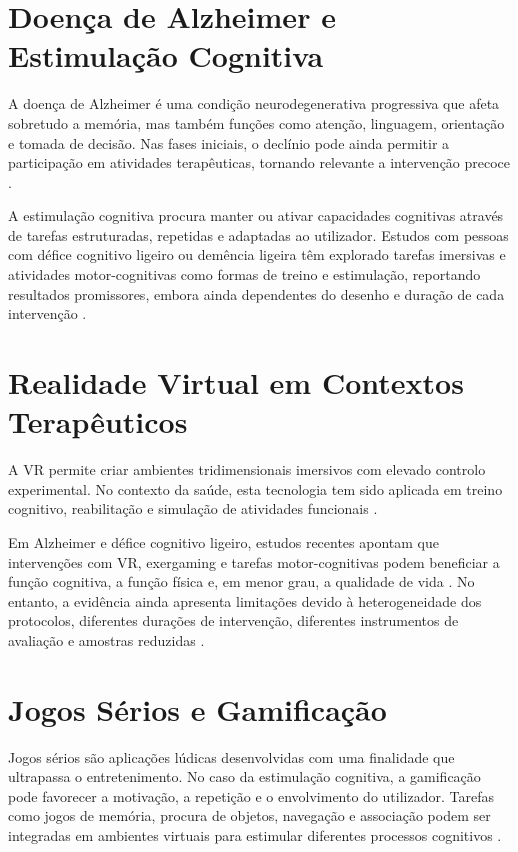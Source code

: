 \documentclass[12pt,a4paper,oneside]{report}
\begin{document}
\section{Doença de Alzheimer e Estimulação Cognitiva}

A doença de Alzheimer é uma condição neurodegenerativa progressiva que afeta sobretudo a memória, mas também funções como atenção, linguagem, orientação e tomada de decisão. Nas fases iniciais, o declínio pode ainda permitir a participação em atividades terapêuticas, tornando relevante a intervenção precoce \cite{oliveira2021,goncalves2025}.

A estimulação cognitiva procura manter ou ativar capacidades cognitivas através de tarefas estruturadas, repetidas e adaptadas ao utilizador. Estudos com pessoas com défice cognitivo ligeiro ou demência ligeira têm explorado tarefas imersivas e atividades motor-cognitivas como formas de treino e estimulação, reportando resultados promissores, embora ainda dependentes do desenho e duração de cada intervenção \cite{oliveira2021,thapa2020,yun2020}.

\section{Realidade Virtual em Contextos Terapêuticos}

A \ac{VR} permite criar ambientes tridimensionais imersivos com elevado controlo experimental. No contexto da saúde, esta tecnologia tem sido aplicada em treino cognitivo, reabilitação e simulação de atividades funcionais \cite{vasquez2025,goncalves2025}.

Em Alzheimer e défice cognitivo ligeiro, estudos recentes apontam que intervenções com \ac{VR}, exergaming e tarefas motor-cognitivas podem beneficiar a função cognitiva, a função física e, em menor grau, a qualidade de vida \cite{vasquez2025,thapa2020}. No entanto, a evidência ainda apresenta limitações devido à heterogeneidade dos protocolos, diferentes durações de intervenção, diferentes instrumentos de avaliação e amostras reduzidas \cite{vasquez2025}.

\section{Jogos Sérios e Gamificação}

Jogos sérios são aplicações lúdicas desenvolvidas com uma finalidade que ultrapassa o entretenimento. No caso da estimulação cognitiva, a gamificação pode favorecer a motivação, a repetição e o envolvimento do utilizador. Tarefas como jogos de memória, procura de objetos, navegação e associação podem ser integradas em ambientes virtuais para estimular diferentes processos cognitivos \cite{xiong2024,goncalves2025}.
\end{document}
